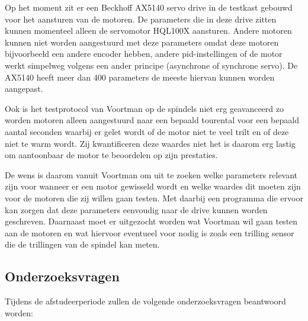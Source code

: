 Op het moment zit er een Beckhoff \gls{AX5140} servo drive in de testkast gebouwd voor het aansturen van de motoren. De parameters die in deze drive zitten kunnen momenteel alleen de servomotor HQL100X aansturen. Andere motoren kunnen niet worden aangestuurd met deze parameters omdat deze motoren bijvoorbeeld een andere encoder hebben, andere \gls{pid}-instellingen of de motor werkt simpelweg volgens een ander principe (asynchrone of synchrone servo). De \gls{AX5140} heeft meer dan 400 parameters de meeste hiervan kunnen worden aangepast.

\vspace{0.5cm}

Ook is het testprotocol van Voortman op de spindels niet erg geavanceerd zo worden motoren alleen aangestuurd naar een bepaald tourental voor een bepaald aantal seconden waarbij er gelet wordt of de motor niet te veel trilt en of deze niet te warm wordt. Zij kwantificeren deze waardes niet het is daarom erg lastig om aantoonbaar de motor te beoordelen op zijn prestaties.

\vspace{0.5cm}

De wens is daarom vanuit Voortman om uit te zoeken welke parameters relevant zijn voor wanneer er een motor gewisseld wordt en welke waardes dit moeten zijn voor de motoren die zij willen gaan testen. Met daarbij een programma die ervoor kan zorgen dat deze parameters eenvoudig naar de drive kunnen worden geschreven. Daarnaast moet er uitgezocht worden wat Voortman wil gaan testen aan de motoren en wat hiervoor eventueel voor nodig is zoals een trilling sensor die de trillingen van de spindel kan meten.

\newpage

\subsection{Onderzoeksvragen}

Tijdens de afstudeerperiode zullen de volgende onderzoeksvragen beantwoord worden:

